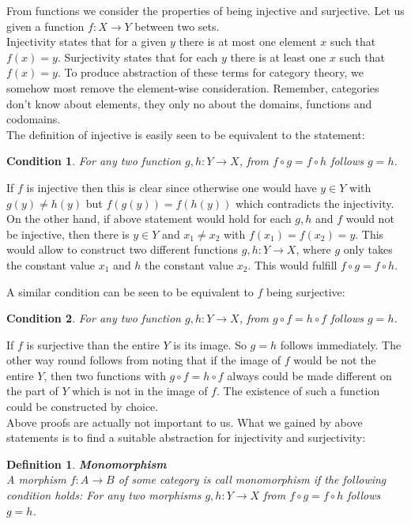 \documentclass[17pt]{extarticle}
\newtheorem{definition}{Definition}
\newtheorem*{condition*}{Condition}
\begin{document}
From functions we consider the properties of being injective and surjective.
Let us given a function $f:X\rightarrow Y$ between two sets.\\
Injectivity states that for a given $y$ there is at most one element $x$ such that $f(x)=y$.
Surjectivity states that for each $y$ there is at least one $x$ such that $f(x)=y$.
To produce abstraction of these terms for category theory, we somehow most remove the element-wise
consideration. Remember, categories don't know about elements, they only no about the domains, functions
and codomains.\\
The definition of injective is easily seen to be equivalent to the statement:
\begin{condition*}
For any two function $g,h:Y\rightarrow X$, from $f\circ g=f\circ h$ follows $g=h$.
\end{condition*}

If $f$ is injective then this is clear since otherwise one would have $y \in Y$ with $g(y)\neq h(y)$ but $f(g(y))=f(h(y))$
which contradicts the injectivity. On the other hand, if above statement would hold for each $g,h$ and $f$ would not be injective, then there is $y\in Y$ and $x_1\neq x_2$ with $f(x_1)=f(x_2)=y$. This would allow to construct two different functions $g, h:Y\rightarrow X$, where $g$ only takes the constant value $x_1$ and $h$ the constant value $x_2$. This would fulfill $f\circ g=f\circ h$.

A similar condition can be seen to be equivalent to $f$ being surjective:
\begin{condition*}
	For any two function $g,h:Y\rightarrow X$, from $g\circ f=h\circ f$ follows $g=h$.
\end{condition*}
If $f$ is surjective than the entire $Y$ is its image. So $g=h$ follows immediately. The other way round follows from noting that if the image of $f$ would be not the entire $Y$, then two functions with $g\circ f=h\circ f$ always could 
be made different on the part of $Y$ which is not in the image of $f$. The existence of such a function could be constructed by choice.\\
Above proofs are actually not important to us. What we gained by above statements is to find a suitable abstraction for injectivity and surjectivity:

\begin{definition}
	\textbf{Monomorphism}\\
	A morphism $f:A\rightarrow B$ of some category is call monomorphism if the following condition holds:
	For any two morphisms $g,h:Y\rightarrow X$ from $f\circ g=f\circ h$ follows $g=h$.	
\end{definition}
\end{document}
